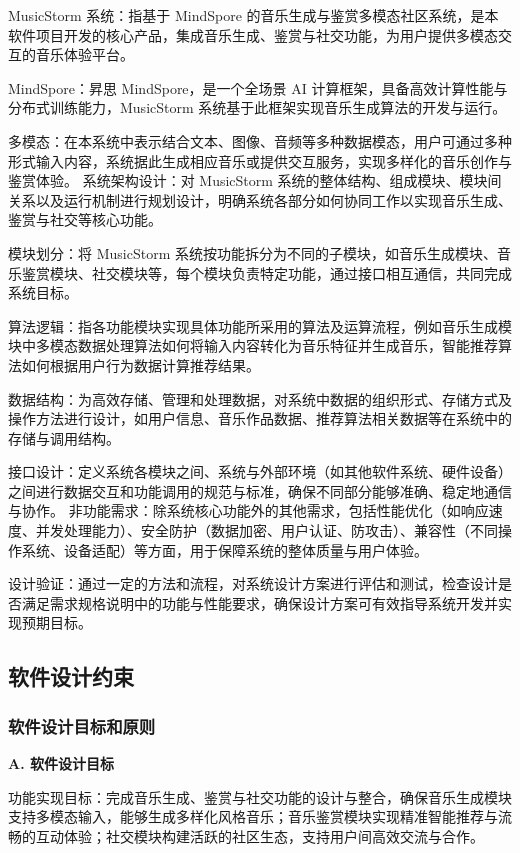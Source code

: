 \documentclass{base}
\numberwithin{figure}{section} %
\begin{document}
MusicStorm 系统：指基于 MindSpore 的音乐生成与鉴赏多模态社区系统，是本软件项目开发的核心产品，集成音乐生成、鉴赏与社交功能，为用户提供多模态交互的音乐体验平台。​

MindSpore：昇思 MindSpore，是一个全场景 AI 计算框架，具备高效计算性能与分布式训练能力，MusicStorm 系统基于此框架实现音乐生成算法的开发与运行。​

多模态：在本系统中表示结合文本、图像、音频等多种数据模态，用户可通过多种形式输入内容，系统据此生成相应音乐或提供交互服务，实现多样化的音乐创作与鉴赏体验。
系统架构设计：对 MusicStorm 系统的整体结构、组成模块、模块间关系以及运行机制进行规划设计，明确系统各部分如何协同工作以实现音乐生成、鉴赏与社交等核心功能。​

模块划分：将 MusicStorm 系统按功能拆分为不同的子模块，如音乐生成模块、音乐鉴赏模块、社交模块等，每个模块负责特定功能，通过接口相互通信，共同完成系统目标。​

算法逻辑：指各功能模块实现具体功能所采用的算法及运算流程，例如音乐生成模块中多模态数据处理算法如何将输入内容转化为音乐特征并生成音乐，智能推荐算法如何根据用户行为数据计算推荐结果。​

数据结构：为高效存储、管理和处理数据，对系统中数据的组织形式、存储方式及操作方法进行设计，如用户信息、音乐作品数据、推荐算法相关数据等在系统中的存储与调用结构。​

接口设计：定义系统各模块之间、系统与外部环境（如其他软件系统、硬件设备）之间进行数据交互和功能调用的规范与标准，确保不同部分能够准确、稳定地通信与协作。
非功能需求：除系统核心功能外的其他需求，包括性能优化（如响应速度、并发处理能力）、安全防护（数据加密、用户认证、防攻击）、兼容性（不同操作系统、设备适配）等方面，用于保障系统的整体质量与用户体验。​

设计验证：通过一定的方法和流程，对系统设计方案进行评估和测试，检查设计是否满足需求规格说明中的功能与性能要求，确保设计方案可有效指导系统开发并实现预期目标。

\subsection{软件设计约束}

\subsubsection{软件设计目标和原则}

\textbf{A. 软件设计目标​}

功能实现目标：完成音乐生成、鉴赏与社交功能的设计与整合，确保音乐生成模块支持多模态输入，能够生成多样化风格音乐；音乐鉴赏模块实现精准智能推荐与流畅的互动体验；社交模块构建活跃的社区生态，支持用户间高效交流与合作。
\end{document}
